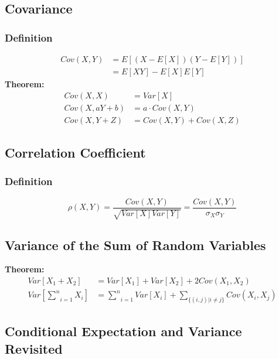 \documentclass[11pt]{article}
\begin{document}
\subsection{Covariance}
\subsubsection{Definition}
\begin{equation*}
    \begin{split}
        Cov(X,Y) & = E[(X-E[X])(Y-E[Y])]\\
        & = E[XY] - E[X]E[Y]
    \end{split}
\end{equation*}
\noindent \textbf{Theorem:}\\
\begin{equation*}
    \begin{split}
        Cov(X,X) & = Var[X]\\
        Cov(X,aY+b) & = a\cdot Cov(X,Y)\\
        Cov(X, Y+Z) & = Cov(X,Y) + Cov(X,Z)
    \end{split}
\end{equation*}

\subsection{Correlation Coefficient}
\subsubsection{Definition}
$$\rho(X,Y) = \frac{Cov(X,Y)}{\sqrt{Var[X]Var[Y]}} = \frac{Cov(X,Y)}{\sigma_X \sigma_Y}$$

\subsection{Variance of the Sum of Random Variables}
\noindent \textbf{Theorem:}\\
\begin{equation*}
    \begin{split}
        Var[X_1+X_2] & = Var[X_1] + Var[X_2] + 2Cov(X_1, X_2)\\
        Var\left[\underset{i=1}{\sum^n}X_i\right] & = \underset{i=1}{\sum^n} Var[X_i] + \underset{\{(i,j)|i\neq j\}}{\sum} Cov(X_i, X_j)
    \end{split}
\end{equation*}

\subsection{Conditional Expectation and Variance Revisited}
\end{document}
